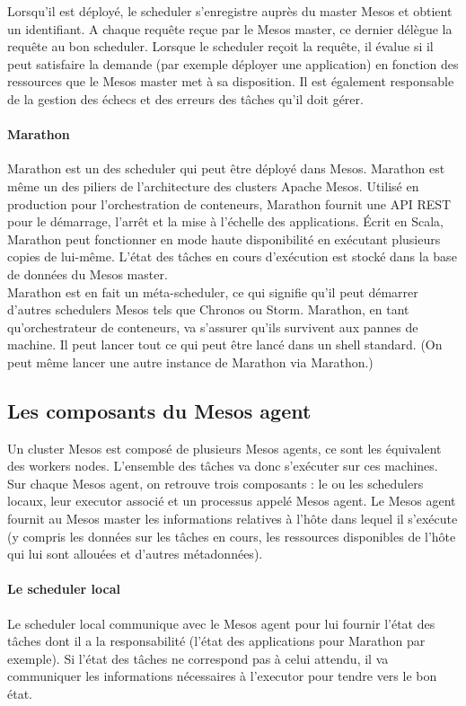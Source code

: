 \documentclass[11pt,fleqn]{book} %
\begin{document}
Lorsqu'il est déployé, le scheduler s'enregistre auprès du master Mesos et obtient un identifiant. A chaque requête reçue par le Mesos master, ce dernier délègue la requête au bon scheduler. Lorsque le scheduler reçoit la requête, il évalue si il peut satisfaire la demande (par exemple déployer une application) en fonction des ressources que le Mesos master met à sa disposition. Il est également responsable de la gestion des échecs et des erreurs des tâches qu'il doit gérer. \\
\paragraph*{Marathon}
Marathon est un des scheduler qui peut être déployé dans Mesos. Marathon est même un des piliers de l'architecture des clusters Apache Mesos. Utilisé en production pour l'orchestration de conteneurs, Marathon fournit une API REST pour le démarrage, l'arrêt et la mise à l'échelle des applications. Écrit en Scala, Marathon peut fonctionner en mode haute disponibilité en exécutant plusieurs copies de lui-même. L'état des tâches en cours d'exécution est stocké dans la base de données du Mesos master.\\

Marathon est en fait un méta-scheduler, ce qui signifie qu'il peut démarrer d'autres schedulers Mesos tels que Chronos ou Storm. Marathon, en tant qu'orchestrateur de conteneurs, va s'assurer qu'ils survivent aux pannes de machine. Il peut lancer tout ce qui peut être lancé dans un shell standard. (On peut même lancer une autre instance de Marathon via Marathon.)

\subsection*{Les composants du Mesos agent}
Un cluster Mesos est composé de plusieurs Mesos agents, ce sont les équivalent des workers nodes. L'ensemble des tâches va donc s'exécuter sur ces machines. Sur chaque Mesos agent, on retrouve trois composants : le ou les schedulers locaux, leur executor associé et un processus appelé Mesos agent. Le Mesos agent fournit au Mesos master les informations relatives à l'hôte dans lequel il s'exécute (y compris les données sur les tâches en cours, les ressources disponibles de l'hôte qui lui sont allouées et d'autres métadonnées).

\paragraph*{Le scheduler local}
Le scheduler local communique avec le Mesos agent pour lui fournir l'état des tâches dont il a la responsabilité (l'état des applications pour Marathon par exemple). Si l'état des tâches ne correspond pas à celui attendu, il va communiquer les informations nécessaires à l'executor pour tendre vers le bon état.
\end{document}
